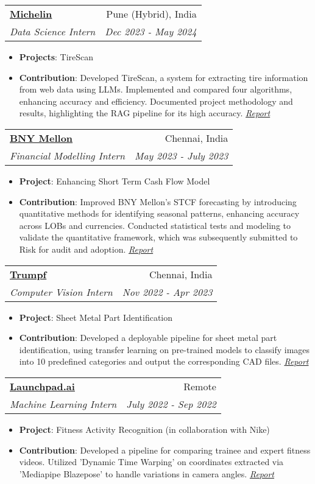 \documentclass[a4paper,20pt]{article}
\makeatletter
\newcommand{\resumeItem}[2]{
  \item\small{
    \textbf{#1}{: #2 \vspace{-2pt}}
  }
}
\newcommand{\resumeSubheading}[4]{
  \vspace{-1pt}\item
    \begin{tabular*}{0.97\textwidth}{l@{\extracolsep{\fill}}r}
      \textbf{#1} & #2 \\
      \textit{#3} & \textit{#4} \\
    \end{tabular*}\vspace{-5pt}
}
\newcommand{\resumeItemListStart}{\begin{itemize}}
\newcommand{\resumeItemListEnd}{\end{itemize}\vspace{-5pt}}
\makeatother
\begin{document}
\resumeSubheading{\href{https://www.michelin.in/}{Michelin}}{Pune (Hybrid), India}
{Data Science Intern}{Dec 2023 - May 2024}
\resumeItemListStart
    \resumeItem{Projects}
      {TireScan}
    \resumeItem{Contribution}
      {Developed TireScan, a system for extracting tire information from web data using LLMs. Implemented and compared four algorithms, enhancing accuracy and efficiency. Documented project methodology and results, highlighting the RAG pipeline for its high accuracy. \textit{\href{https://github.com/sampadk04/Internship_Reports/blob/main/BNY_Mellon/Enhancing_Short_Term_Cashflow-Internship_Report.pdf}{Report}}}
  \resumeItemListEnd

    \resumeSubheading{\href{https://www.bnymellon.com/}{BNY Mellon}}{Chennai, India}
    {Financial Modelling Intern}{May 2023 - July 2023}
    \resumeItemListStart
        \resumeItem{Project}
          {Enhancing Short Term Cash Flow Model}
        \resumeItem{Contribution}
          {Improved BNY Mellon's STCF forecasting by introducing quantitative methods for identifying seasonal patterns, enhancing accuracy across LOBs and currencies. Conducted statistical tests and modeling to validate the quantitative framework, which was subsequently submitted to Risk for audit and adoption. \textit{\href{https://github.com/sampadk04/Internship_Reports/blob/main/BNY_Mellon/Enhancing_Short_Term_Cashflow-Internship_Report.pdf}{Report}}}
      \resumeItemListEnd

    \resumeSubheading{\href{https://www.trumpf.com/en_IN/}{Trumpf}}{Chennai, India}
    {Computer Vision Intern}{Nov 2022 - Apr 2023}
    \resumeItemListStart
        \resumeItem{Project}
          {Sheet Metal Part Identification}
        \resumeItem{Contribution}
          {Developed a deployable pipeline for sheet metal part identification, using transfer learning on pre-trained models to classify images into 10 predefined categories and output the corresponding CAD files. \textit{\href{https://github.com/sampadk04/Internship_Reports/blob/main/Trumpf_Metamation/Sheet_Metal_Part_Recognition-Internship_Report.pdf}{Report}}}
      \resumeItemListEnd

    \resumeSubheading{\href{https://www.launchpad.ai}{Launchpad.ai}}{Remote}
    {Machine Learning Intern}{July 2022 - Sep 2022}
    \resumeItemListStart
        \resumeItem{Project}
          {Fitness Activity Recognition (in collaboration with Nike)}
        \resumeItem{Contribution}
          {Developed a pipeline for comparing trainee and expert fitness videos. Utilized 'Dynamic Time Warping' on coordinates extracted via 'Mediapipe Blazepose' to handle variations in camera angles. \textit{\href{https://github.com/sampadk04/Internship_Reports/blob/main/Launchpad/Fitness_Activity_Recognition-Final_Report.pdf}{Report}}}
      \resumeItemListEnd
\end{document}

